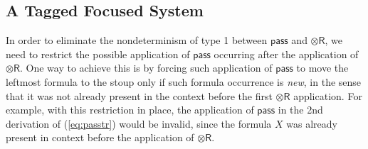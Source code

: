 \documentclass[submission,copyright,creativecommons]{eptcs}
\theoremstyle{definition}
\newcommand{\tr}{\otimes \mathsf{R}}
\newcommand{\lright}{{\multimap}\mathsf{R}}
\newcommand{\lleft}{{\multimap}\mathsf{L}}
\newcommand{\pass}{\mathsf{pass}}
\newcommand{\ax}{\mathsf{ax}}
\newcommand{\ot}{\otimes}
\newcommand{\lolli}{\multimap}
\newcommand{\RI}{\mathsf{RI}}
\newcommand{\LI}{\mathsf{LI}}
\newcommand{\Pass}{\mathsf{P}}
\newcommand{\F}{\mathsf{F}}
\newcommand{\NMILL}{\texttt{NMILL}}
\newcommand{\SkNMILL}{\NMILL\textsuperscript{\textit{s}}}
\begin{document}
%

\subsection{A Tagged Focused System}\label{sec:tag}

In order to eliminate the nondeterminism of type 1 between $\pass$ and $\tr$, we need to restrict the possible application of $\pass$ occurring after the application of $\tr$. 
One way to achieve this is by forcing such application of $\pass$ to move the leftmost formula to the stoup only if such formula occurrence is \emph{new}, in the sense that it was not already present in the context before the first $\tr$ application. For example, with this restriction in place, the application of $\pass$ in the 2nd derivation of (\ref{eq:passtr}) would be invalid, since the formula $X$ was already present in context before the application of $\tr$.
\end{document}
